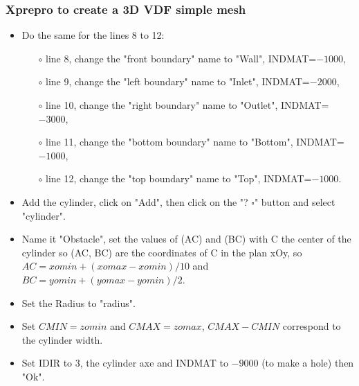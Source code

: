 \documentclass[10pt, hyperref={unicode=true,pdfusetitle, bookmarks=true,bookmarksnumbered=false,bookmarksopen=false, breaklinks=false,pdfborder={0 0 1},backref=true,colorlinks=true,linkcolor=darkblue,pageanchor}]{beamer}
\begin{document}
\begin{frame}
\frametitle{Xprepro to create a 3D VDF simple mesh}
\begin{block}{}

\begin{itemize}
\item Do the same for the lines 8 to 12:
    \begin{itemize}
    \item [$\circ$] line 8, change the "front boundary" name to "Wall", INDMAT=$-1000$,
    \item [$\circ$] line 9, change the "left boundary" name to "Inlet", INDMAT=$-2000$,
    \item [$\circ$] line 10, change the "right boundary" name to "Outlet", INDMAT=$-3000$,
    \item [$\circ$] line 11, change the "bottom boundary" name to "Bottom", INDMAT=$-1000$,
    \item [$\circ$] line 12, change the "top boundary" name to "Top", INDMAT=$-1000$.
    \end{itemize}
\item Add the cylinder, click on "Add", then click on the "? $\square$" button and select "cylinder".
\item Name it "Obstacle", set the values of (AC) and (BC) with C the center of the cylinder so (AC, BC) are the coordinates of C in the plan xOy, so $AC=xomin+(xomax-xomin)/10$ and $BC=yomin+(yomax-yomin)/2$.
\item Set the Radius to "radius".
\item Set $CMIN=zomin$ and $CMAX=zomax$, $CMAX-CMIN$ correspond to the cylinder width.
\item Set IDIR to $3$, the cylinder axe and INDMAT to $-9000$ (to make a hole) then "Ok".

\end{itemize}

\end{block}
\end{frame}
\end{document}
